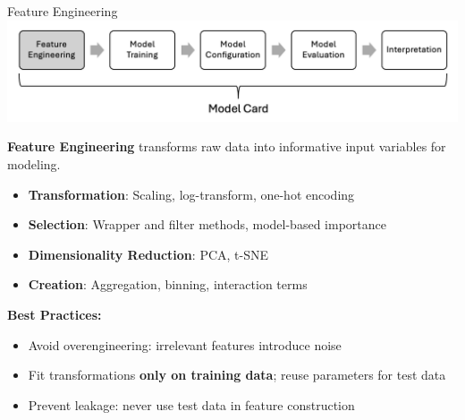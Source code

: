\documentclass[10pt,compress,t,notes=noshow, xcolor=table]{beamer}
\begin{document}
\begin{frame}[t]{Feature Engineering}
\label{feature-engineering}
\includegraphics[width = \linewidth, trim=0 60 0 0, clip]{figure_man/Modelling2.png}

\textbf{Feature Engineering} transforms raw data into informative input variables for modeling.

\begin{itemize}
  \item \textbf{Transformation}: Scaling, log-transform, one-hot encoding
  \item \textbf{Selection}: Wrapper and filter methods, model-based importance
  \item \textbf{Dimensionality Reduction}: PCA, t-SNE
  \item \textbf{Creation}: Aggregation, binning, interaction terms
\end{itemize}

\textbf{Best Practices:}
\begin{itemize}
  \item Avoid overengineering: irrelevant features introduce noise
  \item Fit transformations \textbf{only on training data}; reuse parameters for test data
  \item Prevent leakage: never use test data in feature construction
\end{itemize}

\end{frame}
\end{document}
